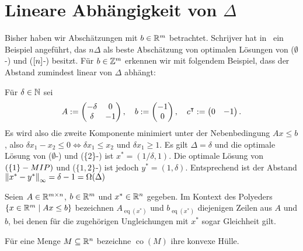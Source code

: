 \newcommand{\one}{\mathbbm{1}}
\newcommand{\eq}[1]{{\operatorname{eq}(#1)}}
\newcommand{\co}[1]{\operatorname{co}(#1)}

\section{Lineare Abhängigkeit von $\Delta$}\label{sec:linear}

Bisher haben wir Abschätzungen mit $b\in\mathbb{R}^m$ betrachtet.
Schrijver hat in~\cite[Kapitel~17.2]{Schrijver1986} ein Beispiel angeführt, das $n\Delta$ als beste Abschätzung von optimalen Lösungen von ($\emptyset$-\MIPR) und ($[n]$-\MIPR) besitzt.
Für $b\in\mathbb{Z}^m$ erkennen wir mit folgendem Beispiel, dass der Abstand zumindest linear von $\Delta$ abhängt:
\begin{example}
	Für $\delta\in\mathbb{N}$ sei
	$$A:=
	\begin{pmatrix}
	-\delta & 0  \\
	\delta  & -1
	\end{pmatrix},\quad
	b:=\begin{pmatrix} -1 \\ 0 \end{pmatrix},\quad
	c^\intercal:=\begin{pmatrix}0 & -1\end{pmatrix}.
	$$
	Es wird also die zweite Komponente minimiert unter der Nebenbedingung $Ax\leq b$, also $\delta x_1-x_2\leq0\Leftrightarrow\delta x_1\leq x_2$ und $\delta x_1\geq 1$.
	Es gilt $\Delta=\delta$ und die optimale Lösung von ($\emptyset$-\MIPI) und (\{2\}-\MIPI) ist $x^*=(1/\delta,1)$.
	Die optimale Lösung von $(\{1\}-MIP)$ und ($\{1, 2\}$-\MIPI) ist jedoch $y^*=(1,\delta)$.
	Entsprechend ist der Abstand $\left\lVert x^*-y^*\right\rVert_\infty=\delta-1=\Omega(\Delta)$
\end{example}

\begin{notation}
	Seien $A\in\mathbb{R}^{m\times n}$, $b\in\mathbb{R}^m$ und $x^*\in\mathbb{R}^n$ gegeben.
	Im Kontext des Polyeders $\{ x\in\mathbb{R}^m \mid Ax\leq b \}$ bezeichnen
	$A_\eq{x^*}$ und $b_\eq{x^*}$ diejenigen Zeilen aus $A$ und $b$, bei denen für die zugehörigen Ungleichungen mit $x^*$ sogar Gleichheit gilt.
	
	Für eine Menge $M\subseteq \mathbb{R}^n$ bezeichne $\co{M}$ ihre konvexe Hülle.
\end{notation}

